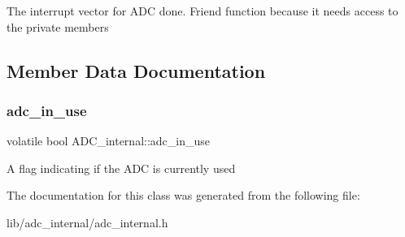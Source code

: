 The interrupt vector for A\+DC done. Friend function because it needs access to the private members 

\subsection{Member Data Documentation}
\hypertarget{class_a_d_c__internal_a7313da9fa620eae7be708a58d35dbe71}{}\label{class_a_d_c__internal_a7313da9fa620eae7be708a58d35dbe71} 
\subsubsection{\texorpdfstring{adc\+\_\+in\+\_\+use}{adc\_in\_use}}
{\footnotesize\ttfamily volatile bool A\+D\+C\+\_\+internal\+::adc\+\_\+in\+\_\+use\hspace{0.3cm}{\ttfamily [private]}}

A flag indicating if the A\+DC is currently used 

The documentation for this class was generated from the following file\+:\begin{DoxyCompactItemize}
\item 
lib/adc\+\_\+internal/adc\+\_\+internal.\+h\end{DoxyCompactItemize}
